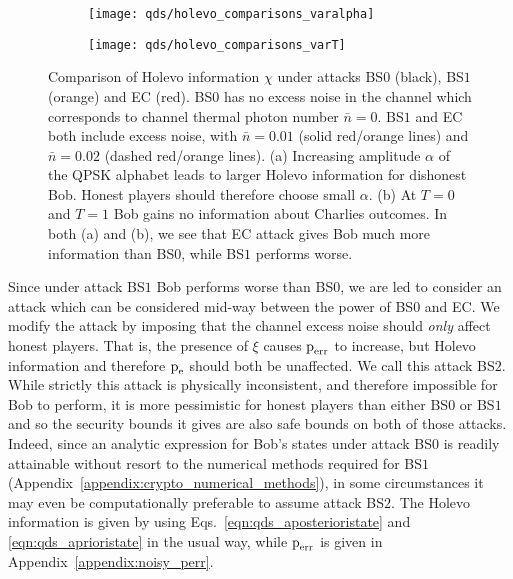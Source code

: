 \begin{figure}[htp]
\captionsetup{width=0.8\linewidth}
\centering
	\begin{subfigure}{0.7\linewidth}
		\centering
		\caption{\label{fig:qds_holevo_comparisons_varalpha}}
		\texttt{[image: qds/holevo\_comparisons\_varalpha]}
	\end{subfigure}
	\begin{subfigure}{0.7\linewidth}
		\centering
		\caption{\label{fig:qds_holevo_comparisons_varT}}
		\texttt{[image: qds/holevo\_comparisons\_varT]}	
	\end{subfigure}
	\caption{\label{fig:qds_holevo_comparisons} Comparison of Holevo information $\chi$ under attacks BS$0$ (black), BS$1$ (orange) and EC (red). BS$0$ has no excess noise in the channel which corresponds to channel thermal photon number $\bar{n} = 0$. BS$1$ and EC both include excess noise, with $\bar{n} = 0.01$ (solid red/orange lines) and $\bar{n} = 0.02$ (dashed red/orange lines). (a) Increasing amplitude $\alpha$ of the QPSK alphabet leads to larger Holevo information for dishonest Bob. Honest players should therefore choose small $\alpha$. (b) At $T=0$ and $T=1$ Bob gains no information about Charlies outcomes. In both (a) and (b), we see that EC attack gives Bob much more information than BS$0$, while BS$1$ performs worse.}
\end{figure}

Since under attack BS$1$ Bob performs worse than BS$0$, we are led to consider an attack which can be considered mid-way between the power of BS$0$ and EC. We modify the attack by imposing that the channel excess noise should \emph{only} affect honest players. That is, the presence of $\xi$ causes $\text{p}_{\text{err}}$ to increase, but Holevo information and therefore $\text{p}_{\text{e}}$ should both be unaffected. We call this attack BS$2$. While strictly this attack is physically inconsistent, and therefore impossible for Bob to perform, it is more pessimistic for honest players than either BS$0$ or BS$1$ and so the security bounds it gives are also safe bounds on both of those attacks. Indeed, since an analytic expression for Bob's states under attack BS$0$ is readily attainable without resort to the numerical methods required for BS$1$ (Appendix~\ref{appendix:crypto_numerical_methods}), in some circumstances it may even be computationally preferable to assume attack BS$2$. The Holevo information is given by using Eqs.~\ref{eqn:qds_aposterioristate} and \ref{eqn:qds_aprioristate} in the usual way, while $\text{p}_{\text{err}}$ is given in Appendix~\ref{appendix:noisy_perr}.


